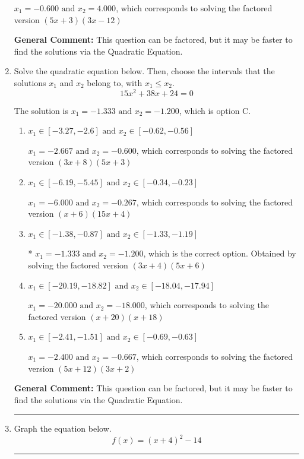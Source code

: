 \documentclass{extbook}[14pt]
\newcommand{\litem}[1]{\item #1

\rule{\textwidth}{0.4pt}}
\begin{document}
\begin{enumerate}
{\begin{enumerate}[label=\Alph*.]
$x_1 = -0.600 \text{ and } x_2 = 4.000$, which corresponds to solving the factored version $(5x + 3)(3x -12)$
\end{enumerate}

\textbf{General Comment:} This question can be factored, but it may be faster to find the solutions via the Quadratic Equation.
}
\litem{
Solve the quadratic equation below. Then, choose the intervals that the solutions $x_1$ and $x_2$ belong to, with $x_1 \leq x_2$.
\[ 15x^{2} +38 x + 24 = 0 \]

The solution is \( x_1 = -1.333 \text{ and } x_2 = -1.200 \), which is option C.\begin{enumerate}[label=\Alph*.]
\item \( x_1 \in [-3.27, -2.6] \text{ and } x_2 \in [-0.62, -0.56] \)

$x_1 = -2.667 \text{ and } x_2 = -0.600$, which corresponds to solving the factored version $(3x + 8)(5x + 3)$
\item \( x_1 \in [-6.19, -5.45] \text{ and } x_2 \in [-0.34, -0.23] \)

$x_1 = -6.000 \text{ and } x_2 = -0.267$, which corresponds to solving the factored version $(x + 6)(15x + 4)$
\item \( x_1 \in [-1.38, -0.87] \text{ and } x_2 \in [-1.33, -1.19] \)

* $x_1 = -1.333 \text{ and } x_2 = -1.200$, which is the correct option. Obtained by solving the factored version $(3x + 4)(5x + 6)$
\item \( x_1 \in [-20.19, -18.82] \text{ and } x_2 \in [-18.04, -17.94] \)

$x_1 = -20.000 \text{ and } x_2 = -18.000$, which corresponds to solving the factored version $(x + 20)(x + 18)$
\item \( x_1 \in [-2.41, -1.51] \text{ and } x_2 \in [-0.69, -0.63] \)

$x_1 = -2.400 \text{ and } x_2 = -0.667$, which corresponds to solving the factored version $(5x + 12)(3x + 2)$
\end{enumerate}

\textbf{General Comment:} This question can be factored, but it may be faster to find the solutions via the Quadratic Equation.
}
\litem{
Graph the equation below.
\[ f(x) = (x+4)^2 - 14 \]

}
\end{enumerate}
\end{document}
